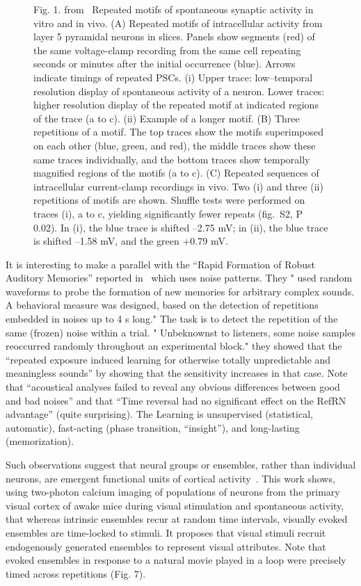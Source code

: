 \documentclass[brainsci, %
               review,submit,pdftex,moreauthors%
               ]{Definitions/mdpi}
\begin{document}
\begin{figure}
\centering
\caption{Fig. 1. from~\citep{ikegaya_synfire_2004} Repeated motifs of spontaneous synaptic activity in vitro and in vivo. (A) Repeated motifs of intracellular activity from layer 5 pyramidal neurons in slices. Panels show segments (red) of the same voltage-clamp recording from the same cell repeating seconds or minutes after the initial occurrence (blue). Arrows indicate timings of repeated PSCs. (i) Upper trace: low--temporal resolution display of spontaneous activity of a neuron. Lower traces: higher resolution display of the repeated motif at indicated regions of the trace (a to c). (ii) Example of a longer motif. (B) Three repetitions of a motif. The top traces show the motifs superimposed on each other (blue, green, and red), the middle traces show these same traces individually, and the bottom traces show temporally magnified regions of the motifs (a to c). (C) Repeated sequences of intracellular current-clamp recordings in vivo. Two (i) and three (ii) repetitions of motifs are shown. Shuffle tests were performed on traces (i), a to c, yielding significantly fewer repeats (fig.~S2, P  0.02). In (i), the blue trace is shifted --2.75 mV; in (ii), the blue trace is shifted --1.58 mV, and the green +0.79 mV.}\label{fig:Ikegaya2004}
\end{figure}

It is interesting to make a parallel with the ``Rapid Formation of Robust Auditory Memories'' reported in~\citep{agus_rapid_2010} which uses noise patterns. They " used random waveforms to probe the formation of new memories for arbitrary complex sounds. A behavioral measure was designed, based on the detection of repetitions embedded in noises up to 4 s long." The task is to detect the repetition of the same (frozen) noise within a trial. " Unbeknownst to listeners, some noise samples reoccurred randomly throughout an experimental block." they showed that the ``repeated exposure induced learning for otherwise totally unpredictable and meaningless sounds'' by showing that the sensitivity increases in that case. Note that ``acoustical analyses failed to reveal any obvious differences between good and bad noises'' and that ``Time reversal had no significant effect on the RefRN advantage'' (quite surprising). The Learning is unsupervised (statistical, automatic), fast-acting (phase transition, ``insight''), and long-lasting (memorization).

Such observations suggest that neural groups or ensembles, rather than individual neurons, are emergent functional units of cortical activity~\citep{miller_visual_2014}. This work shows, using two-photon calcium imaging of populations of neurons from the primary visual cortex of awake mice during visual stimulation and spontaneous activity, that whereas intrinsic ensembles recur at random time intervals, visually evoked ensembles are time-locked to stimuli. It proposes that visual stimuli recruit endogenously generated ensembles to represent visual attributes. Note that evoked ensembles in response to a natural movie played in a loop were precisely timed across repetitions (Fig. 7).
%
\end{document}
